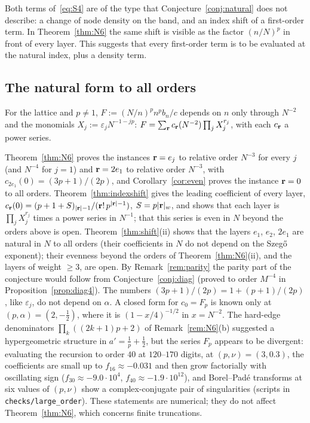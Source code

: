 Both terms of~\eqref{eq:S4} are of the type that Conjecture~\ref{conj:natural} does not describe: a change of node density
on the band, and an index shift of a first-order term. In Theorem~\ref{thm:N6} the same shift is visible as the factor
$(n/N)^p$ in front of every layer. This suggests that every first-order term is to be evaluated at the natural index,
plus a density term.

\subsection{The natural form to all orders}\label{sec:conj-even}
\begin{conjecture}\label{conj:S1Nprime}
For the lattice and $p\ne1$, $F:=(N/n)^pn^pb_n/c$ depends on $n$ only through $N^{-2}$ and the monomials
$X_j:=\varepsilon_jN^{-1-jp}$: $F=\sum_{\mathbf r}c_{\mathbf r}(N^{-2})\prod_jX_j^{r_j}$, with each $c_{\mathbf r}$ a power series.
\end{conjecture}

Theorem~\ref{thm:N6} proves the instances $\mathbf r=e_j$ to relative order $N^{-3}$ for every $j$ (and $N^{-4}$ for $j=1$) and
$\mathbf r=2e_1$ to relative order $N^{-3}$, with $c_{2e_1}(0)=(3p+1)/(2p)$, and Corollary~\ref{cor:even} proves the instance $\mathbf r=0$ to all
orders. Theorem~\ref{thm:indexshift} gives the leading coefficient of every layer, $c_{\mathbf r}(0)=(p+1+S)_{|\mathbf r|-1}/(\mathbf r!\,p^{|\mathbf r|-1})$,
$S=p|\mathbf r|_w$, and shows that each layer is $\prod_jX_j^{r_j}$ times a power series in $N^{-1}$; that this series is even in $N$
beyond the orders above is open. Theorem~\ref{thm:shift}(ii) shows that the layers $e_1$, $e_2$, $2e_1$ are natural in $N$ to all orders (their coefficients in
$N$ do not depend on the Szeg\H{o} exponent); their evenness beyond the orders of Theorem~\ref{thm:N6}(ii), and the layers of weight
$\ge3$, are open. By Remark~\ref{rem:parity} the parity part of the conjecture would follow from Conjecture~\ref{conj:diag}
(proved to order $M^{-4}$ in Proposition~\ref{prop:diag4}). The numbers
$(3p+1)/(2p)=1+(p+1)/(2p)$, like $\varepsilon_j$, do not depend on $\alpha$. A closed form for $c_0=F_p$ is known only at
$(p,\alpha)=(2,-\frac12)$, where it is $(1-x/4)^{-1/2}$ in $x=N^{-2}$. The hard-edge denominators $\prod_k((2k+1)p+2)$ of
Remark~\ref{rem:N6}(b) suggested a hypergeometric structure in $a'=\frac1p+\frac12$, but the series $F_p$ appears to be divergent:
evaluating the recursion to order $40$ at $120$--$170$ digits, at $(p,\nu)=(3,0.3)$, the coefficients are small up to $f_{16}\approx-0.031$
and then grow factorially with oscillating sign ($f_{30}\approx-9.0\cdot10^4$, $f_{40}\approx-1.9\cdot10^{12}$), and Borel--Pad\'e
transforms at six values of $(p,\nu)$ show a complex-conjugate pair of singularities (scripts in \texttt{checks/large\_order}). These
statements are numerical; they do not affect Theorem~\ref{thm:N6}, which concerns finite truncations.

